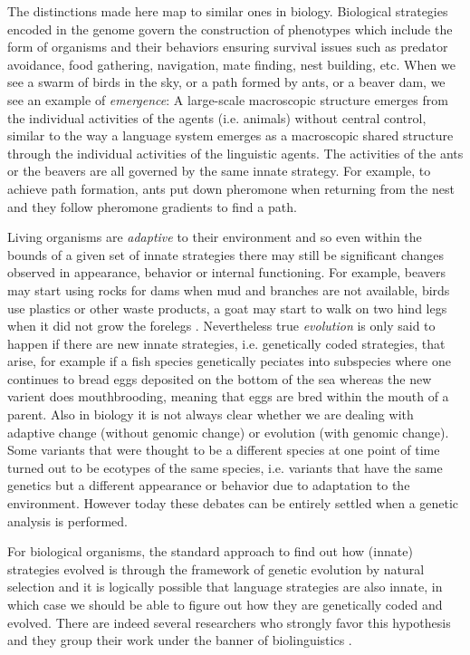 The distinctions made here map to similar ones in biology. Biological strategies encoded in the genome govern the 
construction of phenotypes which include the form of organisms and their behaviors 
ensuring survival issues such as predator avoidance, food gathering, navigation, mate finding, nest building, etc. 
When we see a swarm of birds in the sky, or a path formed by ants, or a beaver dam, we see an example of 
{\itshape emergence}: A large-scale macroscopic structure emerges from the individual activities of the agents (i.e. animals)
without central control, similar to the way a language system emerges as a macroscopic shared structure
through the individual activities of the linguistic agents. The activities of the ants or the beavers are all governed by the 
same innate strategy. For example, to achieve path formation, ants put down pheromone when returning from the nest
and they follow pheromone gradients to find a path. 

Living organisms are {\itshape adaptive} to their environment and so even within 
the bounds of a given set of innate strategies there may still be significant changes observed in appearance, 
behavior or internal functioning. For example, beavers 
may start using rocks for dams when mud and branches are not available, birds use plastics or other waste products, 
a goat may start to walk on two hind legs when it did not grow the forelegs \citep{Jablonka:2013}. 
Nevertheless true {\itshape evolution} is only said to happen if there are new innate 
strategies, i.e. genetically coded strategies, that arise, for example if a fish species genetically 
peciates into subspecies where one continues to bread eggs deposited on the bottom of the sea whereas the 
new varient does mouthbrooding, meaning that eggs are bred within the mouth of a parent. 
Also in biology it is not always clear whether we are dealing with adaptive change (without genomic change) or evolution
(with genomic change). Some variants that were thought to be a different species at one point of time
turned out to be ecotypes of the same species, i.e. variants that 
have the same genetics but a different appearance or behavior due to adaptation to the environment. However today these debates
can be entirely settled when a genetic analysis is performed. 

For biological organisms, the standard approach to find out how (innate) strategies evolved is through the framework  
of genetic evolution by natural selection and it is logically possible that language strategies are also innate, in which 
case we should be able to figure out how they are genetically coded and evolved. 
There are indeed several researchers who strongly favor this hypothesis and they group their work 
under the banner of biolinguistics \citep{Boeckx:2013}. 

